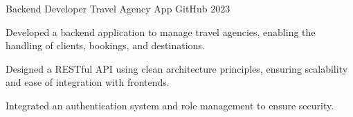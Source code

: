 \begin{cventries}
    \cventry
    {Backend Developer}
    {Travel Agency App}
    {GitHub}
    {2023}
    {
      \begin{cvitems}
        \item {Developed a backend application to manage travel agencies, enabling the handling of clients, bookings, and destinations.}
        \item {Designed a RESTful API using clean architecture principles, ensuring scalability and ease of integration with frontends.}
        \item {Integrated an authentication system and role management to ensure security.}
      \end{cvitems}
    }
\end{cventries}
